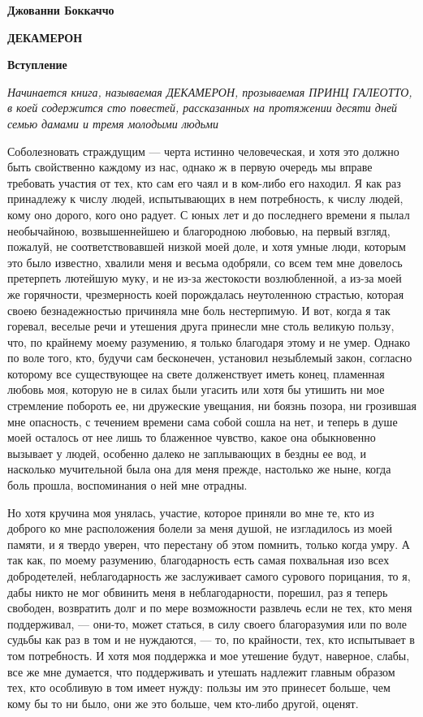 
\textbf{Джованни Боккаччо}


\textbf{ДЕКАМЕРОН}

\textbf{Вступление}

\emph{Начинается книга, называемая ДЕКАМЕРОН, прозываемая ПРИНЦ ГАЛЕОТТО, в коей содержится сто повестей, рассказанных на протяжении десяти дней семью дамами и тремя молодыми людьми}

\bigskip{}

Соболезновать страждущим --- черта истинно человеческая, и хотя это должно быть свойственно каждому из нас, однако ж в первую очередь мы вправе требовать участия от тех, кто сам его чаял и в ком-либо его находил. Я как раз принадлежу к числу людей, испытывающих в нем потребность, к числу людей, кому оно дорого, кого оно радует. С юных лет и до последнего времени я пылал необычайною, возвышеннейшею и благородною любовью, на первый взгляд, пожалуй, не соответствовавшей низкой моей доле, и хотя умные люди, которым это было известно, хвалили меня и весьма одобряли, со всем тем мне довелось претерпеть лютейшую муку, и не из-за жестокости возлюбленной, а из-за моей же горячности, чрезмерность коей порождалась неутоленною страстью, которая своею безнадежностью причиняла мне боль нестерпимую. И вот, когда я так горевал, веселые речи и утешения друга принесли мне столь великую пользу, что, по крайнему моему разумению, я только благодаря этому и не умер. Однако по воле того, кто, будучи сам бесконечен, установил незыблемый закон, согласно которому все существующее на свете долженствует иметь конец, пламенная любовь моя, которую не в силах были угасить или хотя бы утишить ни мое стремление побороть ее, ни дружеские увещания, ни боязнь позора, ни грозившая мне опасность, с течением времени сама собой сошла на нет, и теперь в душе моей осталось от нее лишь то блаженное чувство, какое она обыкновенно вызывает у людей, особенно далеко не заплывающих в бездны ее вод, и насколько мучительной была она для меня прежде, настолько же ныне, когда боль прошла, воспоминания о ней мне отрадны.


Но хотя кручина моя унялась, участие, которое приняли во мне те, кто из доброго ко мне расположения болели за меня душой, не изгладилось из моей памяти, и я твердо уверен, что перестану об этом помнить, только когда умру. А так как, по моему разумению, благодарность есть самая похвальная изо всех добродетелей, неблагодарность же заслуживает самого сурового порицания, то я, дабы никто не мог обвинить меня в неблагодарности, порешил, раз я теперь свободен, возвратить долг и по мере возможности развлечь если не тех, кто меня поддерживал, --- они-то, может статься, в силу своего благоразумия или по воле судьбы как раз в том и не нуждаются, --- то, по крайности, тех, кто испытывает в том потребность. И хотя моя поддержка и мое утешение будут, наверное, слабы, все же мне думается, что поддерживать и утешать надлежит главным образом тех, кто особливую в том имеет нужду: пользы им это принесет больше, чем кому бы то ни было, они же это больше, чем кто-либо другой, оценят.


